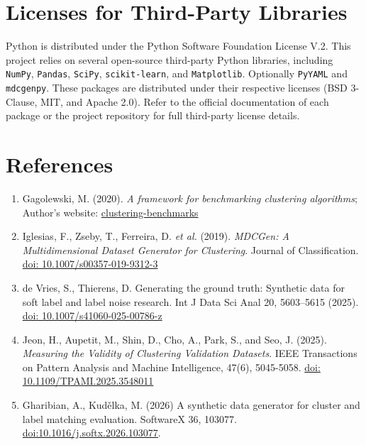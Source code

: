 \documentclass[a4paper,12pt]{article}
\begin{document}
\section*{Licenses for Third-Party Libraries}

Python is distributed under the Python Software Foundation License V.2. This project relies on several open-source third-party Python libraries, including \texttt{NumPy}, \texttt{Pandas}, \texttt{SciPy}, \texttt{scikit-learn}, and \texttt{Matplotlib}. Optionally \texttt{PyYAML} and \texttt{mdcgenpy}. These packages are distributed under their respective licenses (BSD 3-Clause, MIT, and Apache 2.0). Refer to the official documentation of each package or the project repository for full third-party license details.

\section{References}
\begin{enumerate}
    \item Gagolewski, M. (2020). \textit{A framework for benchmarking clustering algorithms}; Author's website: \href{https://clustering-benchmarks.gagolewski.com/weave/suite-v1.html}{clustering-benchmarks}
    \item Iglesias, F., Zseby, T., Ferreira, D. \textit{et al.} (2019). \textit{MDCGen: A Multidimensional Dataset Generator for Clustering}. Journal of Classification. \href{https://link.springer.com/article/10.1007/s00357-019-9312-3}{doi: 10.1007/s00357-019-9312-3}
    \item de Vries, S., Thierens, D. Generating the ground truth: Synthetic data for soft label and label noise research. Int J Data Sci Anal 20, 5603–5615 (2025). \href{https://doi.org/10.1007/s41060-025-00786-z}{doi: 10.1007/s41060-025-00786-z}
    \item Jeon, H., Aupetit, M., Shin, D., Cho, A., Park, S., and Seo, J. (2025). \textit{Measuring the Validity of Clustering Validation Datasets}. IEEE Transactions on Pattern Analysis and Machine Intelligence, 47(6), 5045-5058. \href{https://doi.org/10.1109/TPAMI.2025.3548011}{doi: 10.1109/TPAMI.2025.3548011}
    \item Gharibian, A., Kudělka, M. (2026) A synthetic data generator for cluster and label matching evaluation. SoftwareX 36, 103077.\\
    \href{https://doi.org/10.1016/j.softx.2026.103077}{doi:10.1016/j.softx.2026.103077}.
\end{enumerate}





\end{document}
